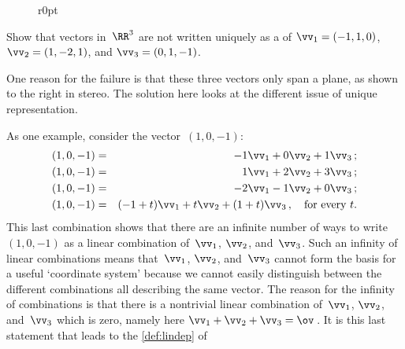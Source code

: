 \begin{wrapfigure}r{0pt}
\end{wrapfigure}
\begin{example}[3D failure] 
Show that vectors in~\(\RR^3\) are not written uniquely as a  of \(\vv_1=(-1,1,0)\), \(\vv_2=(1,-2,1)\), and \(\vv_3=(0,1,-1)\). 

One reason for the failure is that these three vectors only span a plane, as shown to the right in stereo.  
The solution here looks at the different issue of unique representation.

\begin{solution} 
As one example, consider the vector~\((1,0,-1)\):
\begin{eqnarray*}
(1,0,-1)&=&-1\vv_1+0\vv_2+1\vv_3\,;
\\(1,0,-1)&=&1\vv_1+2\vv_2+3\vv_3\,;
\\(1,0,-1)&=&-2\vv_1-1\vv_2+0\vv_3\,;
\\(1,0,-1)&=&(-1+t)\vv_1+t\vv_2+(1+t)\vv_3\,,\quad\text{for every }t.
\end{eqnarray*}
This last combination shows that there are an infinite number of ways to write \((1,0,-1)\) as a linear combination of~\(\vv_1\), \(\vv_2\), and~\(\vv_3\).
Such an infinity of linear combinations means that~\(\vv_1\), \(\vv_2\), and~\(\vv_3\) cannot form the basis for a useful `coordinate system' because we cannot easily distinguish between the different combinations all describing the same vector.
The reason for the infinity of combinations is that there is a nontrivial linear combination of~\(\vv_1\), \(\vv_2\), and~\(\vv_3\) which is zero, namely here \(\vv_1+\vv_2+\vv_3=\ov\)\,.
It is this last statement that leads to the \cref{def:lindep} of 
\end{solution}
\end{example}





